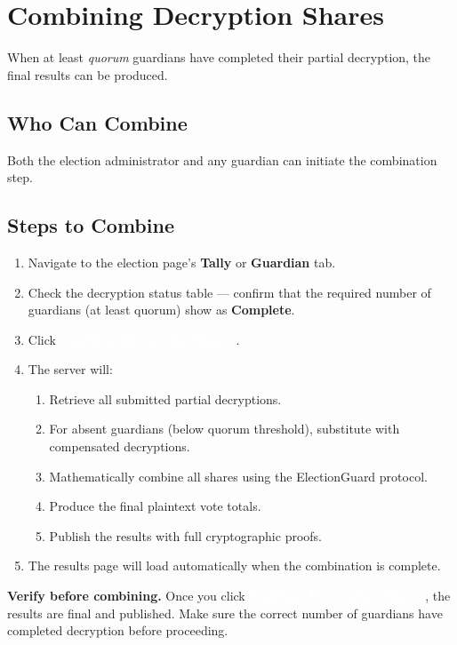 \documentclass[12pt,a4paper]{book}
\newcommand{\uibutton}[1]{\colorbox{guardgreen}{\textcolor{white}{\small\textbf{#1}}}}
\newcommand{\uimenu}[1]{\textbf{\color{guardgreen}#1}}
\begin{document}
\chapter{Combining Decryption Shares}
\label{ch:guard-combine}

When at least \emph{quorum} guardians have completed their partial decryption, the final results can be produced.

\section{Who Can Combine}

Both the election administrator and any guardian can initiate the combination step.

\section{Steps to Combine}

\begin{enumerate}
  \item Navigate to the election page's \uimenu{Tally} or \uimenu{Guardian} tab.
  \item Check the decryption status table --- confirm that the required number of guardians (at least quorum) show as \textbf{Complete}.
  \item Click \uibutton{Combine Decryption Shares}.
  \item The server will:
  \begin{enumerate}
    \item Retrieve all submitted partial decryptions.
    \item For absent guardians (below quorum threshold), substitute with compensated decryptions.
    \item Mathematically combine all shares using the ElectionGuard protocol.
    \item Produce the final plaintext vote totals.
    \item Publish the results with full cryptographic proofs.
  \end{enumerate}
  \item The results page will load automatically when the combination is complete.
\end{enumerate}

\begin{tcolorbox}[warnbox]
\textbf{Verify before combining.} Once you click \uibutton{Combine Decryption Shares}, the results are final and published. Make sure the correct number of guardians have completed decryption before proceeding.
\end{tcolorbox}
\end{document}
